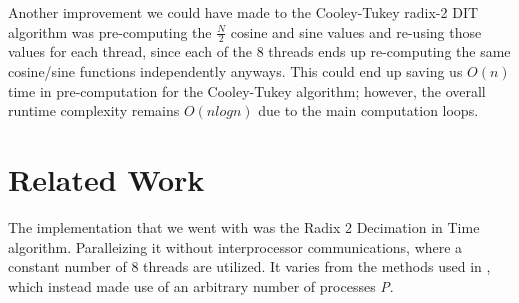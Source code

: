 \documentclass[journal]{IEEEtran}
\begin{document}
	\par{
		Another improvement we could have made to the Cooley-Tukey radix-2 DIT
		algorithm was pre-computing the $\frac{N}{2}$ cosine and sine values and
		re-using those values for each thread, since each of the 8 threads ends 
		up re-computing the same cosine/sine functions independently anyways.
		This could end up saving us $O(n)$ time in pre-computation for the 
		Cooley-Tukey algorithm; however, the overall runtime complexity 
		remains $O(nlogn)$ due to the main computation loops.
	}

\section{Related Work}
	\par{
		The implementation that we went with was the Radix 2 Decimation in Time algorithm. Paralleizing it without 
		interprocessor communications, where a constant number of 8 threads are utilized. It varies from the 
		methods used in \cite{Xie}, which instead made use of an arbitrary number of processes \textit{P}. 
	}
\end{document}
